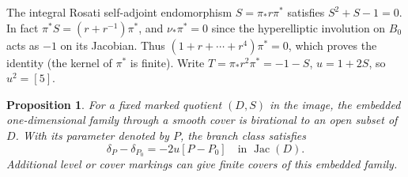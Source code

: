 \documentclass[11pt]{article}
\newtheorem{proposition}[theorem]{Proposition}
\newcommand{\Jac}{\operatorname{Jac}}
\begin{document}
The integral Rosati self-adjoint endomorphism $S=\pi_*r\pi^*$
satisfies $S^2+S-1=0$. In fact $\pi^*S=(r+r^{-1})\pi^*$, and
$\nu_*\pi^*=0$ since the hyperelliptic involution on $B_0$ acts
as $-1$ on its Jacobian. Thus $(1+r+\cdots+r^4)\pi^*=0$,
which proves the identity (the kernel of $\pi^*$ is finite).
Write $T=\pi_*r^2\pi^*=-1-S$, $u=1+2S$, so $u^2=[5]$.

\begin{proposition}\label{moving}
For a fixed marked quotient $(D,S)$ in the image, the embedded
one-dimensional family through a smooth cover is birational to an
open subset of $D$. With its parameter denoted by $P$, the branch
class satisfies
\[
 \delta_P-\delta_{P_0}=-2u[P-P_0]\quad\text{in }\Jac(D).
\]
Additional level or cover markings can give finite covers of this
embedded family.
\end{proposition}
\end{document}
